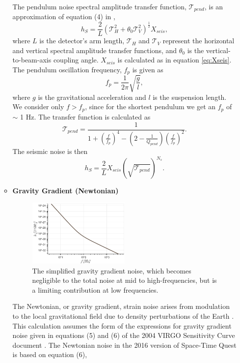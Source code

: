 \documentclass{article}
\begin{document}
\begin{itemize}
\begin{itemize}
    The pendulum noise spectral amplitude transfer function, $\mathcal{T}_{pend}$, is an approximation of equation (4) in \cite{VIRGO},
    \[
    h_{S} = \frac{2}{L}\left(\mathcal{T}_{H}^2 + \theta_0\mathcal{T}_V^2\right)^{\frac{1}{2}}X_{seis},
    \]
    where $L$ is the detector's arm length, $\mathcal{T}_H$ and $\mathcal{T}_V$ represent the horizontal and vertical spectral amplitude transfer functions, and $\theta_0$ is the vertical-to-beam-axis coupling angle. $X_{seis}$ is calculated as in equation \ref{eq:Xseis}.
    The pendulum oscillation frequency, $f_{p}$ is given as
    \[
    f_{p} = \frac{1}{2\pi}\sqrt{\frac{g}{l}} ,
    \] 
    where $g$ is the gravitational acceleration and $l$ is the suspension length. We consider only $f > f_p$, since for the shortest pendulum we get an $f_p$ of $\sim$ 1 Hz. The transfer function is calculated as
    \[
    \mathcal{T}_{pend} = \frac{1}{1 + \left(\frac{f}{f_{p}}\right)^4 - \left(2 - \frac{1}{Q_{pend}}\right)\left(\frac{f}{f_{p}}\right)^2}.
    \]
        The seismic noise is then
    \begin{equation}
        \label{eqn::seismic}
        h_{S} = \frac{2}{L}X_{seis}\left(\sqrt{\mathcal{T}_{pend}}\right)^{N_s}.
    \end{equation}
    \item \textbf{Gravity Gradient (Newtonian)} \par
    \begin{figure}[h!]
    \centering
    \includegraphics[width=0.5\textwidth]{SPQ_aLIGO_gravitygradient.png}
    \caption{The simplified gravity gradient noise, which becomes negligible to the total noise at mid to high-frequencies, but is a limiting contribution at low frequencies.}
    \label{fig:gravity}
    \end{figure}
    The Newtonian, or gravity gradient, strain noise arises from modulation to the local gravitational field due to density perturbations of the Earth \cite{advLIGO}. This calculation assumes the form of the expressions for gravity gradient noise given in equations (5) and (6) of the 2004 VIRGO Sensitivity Curve document \cite{VIRGO}. The Newtonian noise in the 2016 version of Space-Time Quest is based on equation (6),

\end{itemize}
\end{itemize}
\end{document}
